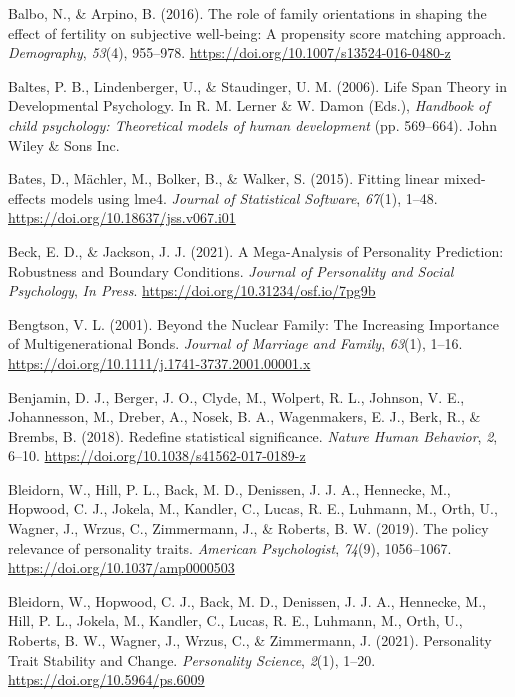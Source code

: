 \documentclass[
  english,
  man, noextraspace]{apa7}
\begin{document}
\leavevmode\hypertarget{ref-balboRoleFamilyOrientations2016}{}%
Balbo, N., \& Arpino, B. (2016). The role of family orientations in shaping the effect of fertility on subjective well-being: A propensity score matching approach. \emph{Demography}, \emph{53}(4), 955--978. \url{https://doi.org/10.1007/s13524-016-0480-z}

\leavevmode\hypertarget{ref-baltesLifeSpanTheory2006}{}%
Baltes, P. B., Lindenberger, U., \& Staudinger, U. M. (2006). Life Span Theory in Developmental Psychology. In R. M. Lerner \& W. Damon (Eds.), \emph{Handbook of child psychology: Theoretical models of human development} (pp. 569--664). John Wiley \& Sons Inc.

\leavevmode\hypertarget{ref-R-lme4}{}%
Bates, D., Mächler, M., Bolker, B., \& Walker, S. (2015). Fitting linear mixed-effects models using lme4. \emph{Journal of Statistical Software}, \emph{67}(1), 1--48. \url{https://doi.org/10.18637/jss.v067.i01}

\leavevmode\hypertarget{ref-beckMegaAnalysisPersonalityPrediction2021}{}%
Beck, E. D., \& Jackson, J. J. (2021). A Mega-Analysis of Personality Prediction: Robustness and Boundary Conditions. \emph{Journal of Personality and Social Psychology}, \emph{In Press}. \url{https://doi.org/10.31234/osf.io/7pg9b}

\leavevmode\hypertarget{ref-bengtsonNuclearFamilyIncreasing2001}{}%
Bengtson, V. L. (2001). Beyond the Nuclear Family: The Increasing Importance of Multigenerational Bonds. \emph{Journal of Marriage and Family}, \emph{63}(1), 1--16. \url{https://doi.org/10.1111/j.1741-3737.2001.00001.x}

\leavevmode\hypertarget{ref-benjaminRedefineStatisticalSignificance2018}{}%
Benjamin, D. J., Berger, J. O., Clyde, M., Wolpert, R. L., Johnson, V. E., Johannesson, M., Dreber, A., Nosek, B. A., Wagenmakers, E. J., Berk, R., \& Brembs, B. (2018). Redefine statistical significance. \emph{Nature Human Behavior}, \emph{2}, 6--10. \url{https://doi.org/10.1038/s41562-017-0189-z}

\leavevmode\hypertarget{ref-bleidornPolicyRelevancePersonality2019}{}%
Bleidorn, W., Hill, P. L., Back, M. D., Denissen, J. J. A., Hennecke, M., Hopwood, C. J., Jokela, M., Kandler, C., Lucas, R. E., Luhmann, M., Orth, U., Wagner, J., Wrzus, C., Zimmermann, J., \& Roberts, B. W. (2019). The policy relevance of personality traits. \emph{American Psychologist}, \emph{74}(9), 1056--1067. \url{https://doi.org/10.1037/amp0000503}

\leavevmode\hypertarget{ref-bleidornPersonalityTraitStability2021}{}%
Bleidorn, W., Hopwood, C. J., Back, M. D., Denissen, J. J. A., Hennecke, M., Hill, P. L., Jokela, M., Kandler, C., Lucas, R. E., Luhmann, M., Orth, U., Roberts, B. W., Wagner, J., Wrzus, C., \& Zimmermann, J. (2021). Personality Trait Stability and Change. \emph{Personality Science}, \emph{2}(1), 1--20. \url{https://doi.org/10.5964/ps.6009}
\end{document}
